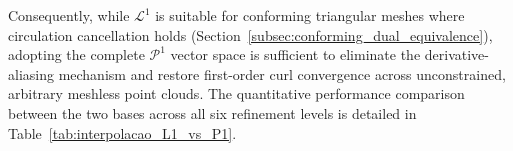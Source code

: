 \documentclass[preprint,12pt]{elsarticle}
\begin{document}
Consequently, while $\mathcal{L}^1$ is suitable for conforming triangular meshes where circulation cancellation holds (Section~\ref{subsec:conforming_dual_equivalence}), adopting the complete $\mathcal{P}^1$ vector space is sufficient to eliminate the derivative-aliasing mechanism and restore first-order curl convergence across unconstrained, arbitrary meshless point clouds. The quantitative performance comparison between the two bases across all six refinement levels is detailed in Table~\ref{tab:interpolacao_L1_vs_P1}.

\begin{table}[!htbp]
    \centering
    \caption{Comparative interpolation and curl error metrics between $\mathcal{L}^1$ and $\mathcal{P}^1$ bases on perturbed point clouds for the $TE_{11}$ mode across six refinement levels.}
    \label{tab:interpolacao_L1_vs_P1}
\end{table}
\end{document}
